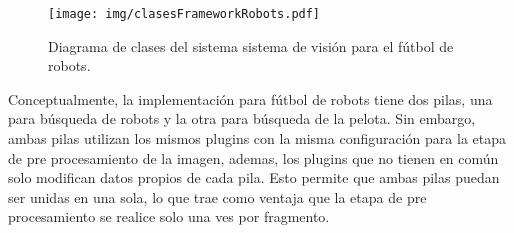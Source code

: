\begin{figure}[h]

	\texttt{[image: img/clasesFrameworkRobots.pdf]}

	\caption{Diagrama de clases del sistema sistema de visión para el fútbol
	de robots.}

\end{figure}

Conceptualmente, la implementación para fútbol de robots tiene dos pilas, una
para búsqueda de robots y la otra para búsqueda de la pelota. Sin embargo, ambas
pilas utilizan los mismos plugins con la misma configuración para la etapa de
pre procesamiento de la imagen, ademas, los plugins que no tienen en común solo
modifican datos propios de cada pila. Esto permite que ambas pilas puedan ser
unidas en una sola, lo que trae como ventaja que la etapa de pre procesamiento
se realice solo una ves por fragmento.
